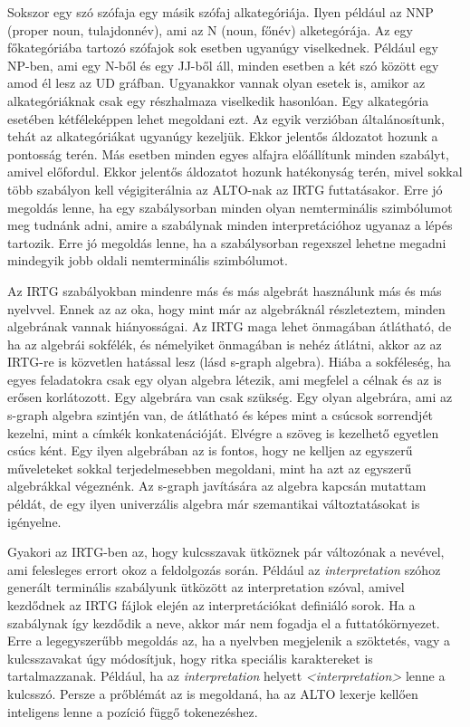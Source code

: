 Sokszor egy szó szófaja egy másik szófaj alkategóriája. Ilyen például az NNP (proper noun, tulajdonnév), ami az N (noun, főnév) alketegórája. Az egy főkategóriába tartozó szófajok sok esetben ugyanúgy viselkednek. Például egy NP-ben, ami egy N-ből és egy JJ-ből áll, minden esetben a két szó között egy amod él lesz az UD gráfban. Ugyanakkor vannak olyan esetek is, amikor az alkategóriáknak csak egy részhalmaza viselkedik hasonlóan. Egy alkategória esetében kétféleképpen lehet megoldani ezt. Az egyik verzióban általánosítunk, tehát az alkategóriákat ugyanúgy kezeljük. Ekkor jelentős áldozatot hozunk a pontosság terén. Más esetben minden egyes alfajra előállítunk minden szabályt, amivel előfordul. Ekkor jelentős áldozatot hozunk hatékonyság terén, mivel sokkal több szabályon kell végigiterálnia az ALTO-nak az IRTG futtatásakor. Erre jó megoldás lenne, ha egy szabálysorban minden olyan nemterminális szimbólumot meg tudnánk adni, amire a szabálynak minden interpretációhoz ugyanaz a lépés tartozik. Erre jó megoldás lenne, ha a szabálysorban regexszel lehetne megadni mindegyik jobb oldali nemterminális szimbólumot.


Az IRTG szabályokban mindenre más és más algebrát használunk más és más nyelvvel. Ennek az az oka, hogy mint már az algebráknál részleteztem, minden algebrának vannak hiányosságai. Az IRTG maga lehet önmagában átlátható, de ha az algebrái sokfélék, és némelyiket önmagában is nehéz átlátni, akkor az az IRTG-re is közvetlen hatással lesz (lásd s-graph algebra). Hiába a sokféleség, ha egyes feladatokra csak egy olyan algebra létezik, ami megfelel a célnak és az is erősen korlátozott. Egy algebrára van csak szükség. Egy olyan algebrára, ami az s-graph algebra szintjén van, de átlátható és képes mint a csúcsok sorrendjét kezelni, mint a címkék konkatenációját. Elvégre a szöveg is kezelhető egyetlen csúcs ként. Egy ilyen algebrában az is fontos, hogy ne kelljen az egyszerű műveleteket sokkal terjedelmesebben megoldani, mint ha azt az egyszerű algebrákkal végeznénk. Az s-graph javítására az algebra kapcsán mutattam példát, de egy ilyen univerzális algebra már szemantikai változtatásokat is igényelne.


Gyakori az IRTG-ben az, hogy kulcsszavak ütköznek pár változónak a nevével, ami felesleges errort okoz a feldolgozás során. Például az \textit{interpretation} szóhoz generált terminális szabályunk ütközött az interpretation szóval, amivel kezdődnek az IRTG fájlok elején az interpretációkat definiáló sorok. Ha a szabálynak így kezdődik a neve, akkor már nem fogadja el a futtatókörnyezet. Erre a legegyszerűbb megoldás az, ha a nyelvben megjelenik a szöktetés, vagy a kulcsszavakat úgy módosítjuk, hogy ritka speciális karaktereket is tartalmazzanak. Például, ha az \textit{interpretation} helyett \textit{<interpretation>} lenne a kulcsszó. Persze a prőblémát az is megoldaná, ha az ALTO lexerje kellően inteligens lenne a pozíció függő tokenezéshez.


